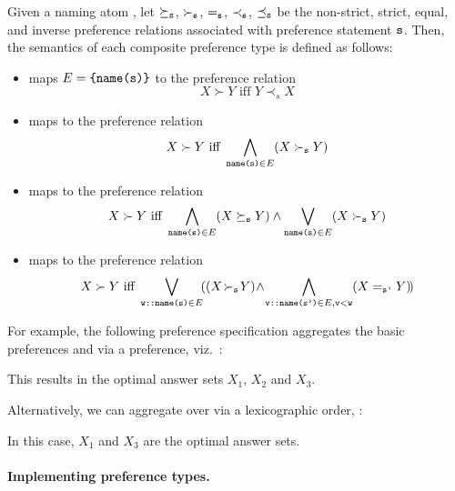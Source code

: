 Given a naming atom , 
let $\succeq_{\texttt{s}}$, $\succ_{\texttt{s}}$, $=_{\texttt{s}}$, $\prec_{\texttt{s}}$, $\preceq_{\texttt{s}}$ be the 
non-strict, strict, equal, and inverse preference relations associated with preference statement $\texttt{s}$.
Then, the semantics of each composite preference type is defined as follows:
\begin{itemize}
\item
{} maps $E=\texttt{\{name(s)\}}$ to the preference relation
\[
X \succ Y \text{ iff } Y \prec_s X
\]
\item 
{} maps  to the preference relation 
\[
X \succ Y \text{ iff } \bigwedge_{\texttt{name(s)}\in E}(X\succ_{\texttt{s}} Y)
\]
\item 
{} maps  to the preference relation 
\[
X \succ Y \text{ iff } \bigwedge_{\texttt{name(s)}\in E} (X\succeq_{\texttt{s}} Y)\wedge\bigvee_{\texttt{name(s)}\in E} (X\succ_{\texttt{s}} Y)
\]
\item
{} maps  to the preference relation 
\[
X \succ Y \text{ iff } \bigvee_{\texttt{w::name(s)}\in E}\!((X\!\succ_{\texttt{s}} \!Y)\!\wedge\!\bigwedge_{\texttt{v::name(s')}\in E,\texttt{v}<\texttt{w}}(X =_{\texttt{s'}} Y)\!)
\] 
\end{itemize} 

For example, the following preference specification aggregates the basic preferences  and 
via a  preference, viz.~: 
%

%
This results in the optimal answer sets $X_1$, $X_2$ and $X_3$.

Alternatively,
we can aggregate  over 
via a lexicographic order, :

In this case, $X_1$ and $X_3$ are the optimal answer sets.

\paragraph{Implementing preference types.}

